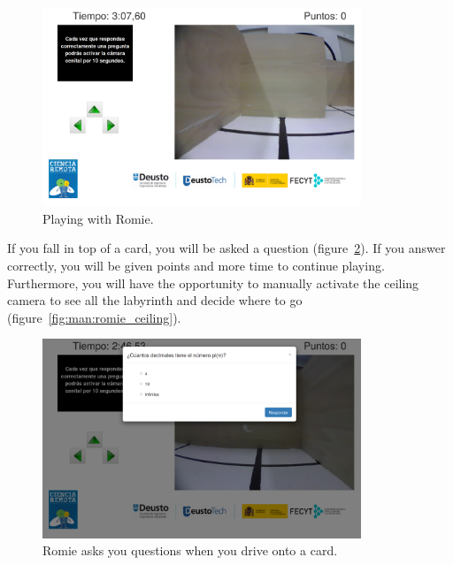 \begin{figure}[!htbp]
	\centering
	\includegraphics[width=0.85\textwidth]{fig/manuals/trivial/romie-start}
	\caption{Playing with Romie.}
	\label{fig:man:romie_start}
\end{figure}

If you fall in top of a card, you will be asked a question (figure~\ref{fig:man:romie_question}). If
you answer correctly, you will be given points and more time to continue playing. Furthermore, you
will have the opportunity to manually activate the ceiling camera to see all the labyrinth and
decide where to go (figure~\ref{fig:man:romie_ceiling}).

\begin{figure}[!htbp]
	\centering
	\includegraphics[width=0.85\textwidth]{fig/manuals/trivial/romie-question}
	\caption{Romie asks you questions when you drive onto a card.}
	\label{fig:man:romie_question}
\end{figure}

